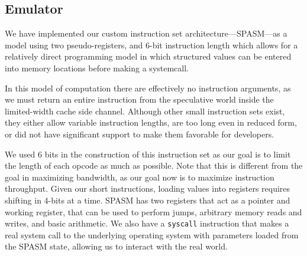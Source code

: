 \FigSpecBandwidth

\subsection{Emulator}
\label{subsec:spasm}


We have implemented our custom instruction set architecture---SPASM---as a model
using two pseudo-registers, and 6-bit instruction length which allows for a
relatively direct programming model in which structured values can be entered
into memory locations before making a systemcall.


%

In this model of computation there are effectively no instruction arguments, as
we must return an entire instruction from the speculative world inside the
limited-width cache side channel. Although other small instruction sets exist,
they either allow variable instruction lengths, are too long even in reduced
form, or did not have significant support to make them favorable for developers.

We used 6 bits in the construction of this instruction set as our goal is to
limit the length of each opcode as much as possible. Note that this is different
from the goal in maximizing bandwidth, as our goal now is to maximize
instruction throughput. Given our short instructions, loading values into
registers requires shifting in 4-bits at a time. SPASM has two registers that
act as a pointer and working register, that can be used to perform jumps,
arbitrary memory reads and writes, and basic arithmetic. We also have a
\texttt{syscall} instruction that makes a real system call to the underlying
operating system with parameters loaded from the SPASM state, allowing us to
interact with the real world. 

